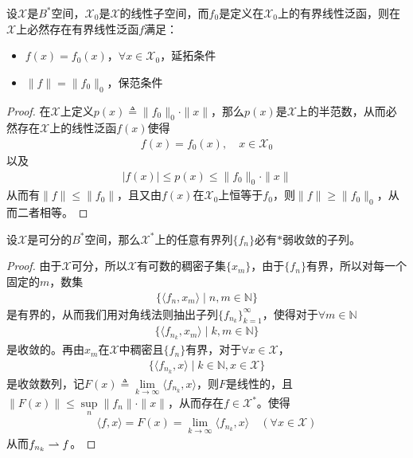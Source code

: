 	
	\begin{theorem}
		设$\mathscr{X}$是$B^*$空间，$\mathscr{X}_0$是$\mathscr{X}$的线性子空间，而$f_0$是定义在$\mathscr{X}_0$上的有界线性泛函，则在$\mathscr{X}$上必然存在有界线性泛函$f$满足：
		\begin{itemize}
			\item $f(x) = f_0(x)$，$\forall x\in\mathscr{X}_0$，延拓条件
			\item $\|f\| = \|f_0\|_0$，保范条件
		\end{itemize}
	\end{theorem}
	\begin{proof}
		在$\mathscr{X}$上定义$p(x)\triangleq \|f_0\|_0 \cdot\|x\|$，那么$p(x)$是$\mathscr{X}$上的半范数，从而必然存在$\mathscr{X}$上的线性泛函$f(x)$使得
		\begin{align*}
			f(x) = f_0(x),\quad x\in\mathscr{X}_0
		\end{align*}
		以及
		\begin{align*}
			|f(x)|\leqslant p(x) \leqslant \|f_0\|_0 \cdot\|x\| 
		\end{align*}
		从而有$\|f\|\leqslant \|f_0\|$，且又由$f(x)$在$\mathscr{X}_0$上恒等于$f_0$，则$\|f\|\geqslant \|f_0\|_0$，从而二者相等。
	\end{proof}
	
	\begin{theorem}
		设$\mathscr{X}$是可分的$B^*$空间，那么$\mathscr{X}^*$上的任意有界列$\{f_n\}$必有$*$弱收敛的子列。
	\end{theorem}
	\begin{proof}
		由于$\mathscr{X}$可分，所以$\mathscr{X}$有可数的稠密子集$\{x_m\}$，由于$\{f_n\}$有界，所以对每一个固定的$m$，数集
		\begin{align*}
			\{\langle f_n, x_m\rangle \mid n, m\in\mathbb{N}\}
		\end{align*}
		是有界的，从而我们用对角线法则抽出子列$\{f_{n_k}\}_{k=1}^{\infty}$，使得对于$\forall m\in\mathbb{N}$
		\begin{align*}
			\{\langle f_{n_k}, x_m\rangle \mid k, m\in\mathbb{N}\}
		\end{align*}
		是收敛的。再由$x_m$在$\mathscr{X}$中稠密且$\{f_n\}$有界，对于$\forall x\in\mathscr{X}$，
		\begin{align*}
			\{ \langle f_{n_k}, x\rangle \mid k \in\mathbb{N}, x\in\mathscr{X}\}
		\end{align*}
		是收敛数列，记$F(x) \triangleq \lim\limits_{k\to\infty}\langle f_{n_k}, x\rangle  $，则$F$是线性的，且$\|F(x)\| \leqslant \sup\limits_{n}\|f_{n}\| \cdot \|x\|$，从而存在$f\in\mathscr{X}^*$。使得
		\begin{align*}
			\langle f, x\rangle = F(x) = \lim\limits_{k\to\infty} \langle f_{n_k}, x\rangle \quad (\forall x\in\mathscr{X}) 
		\end{align*}
		从而$f_{n_k}\rightharpoonup f$。
	\end{proof}
	
